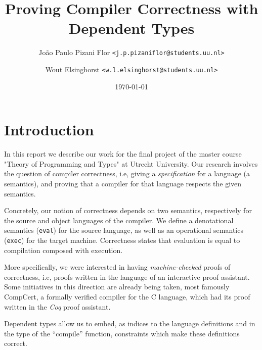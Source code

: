 \documentclass[a4paper]{article}
\title{Proving Compiler Correctness with Dependent Types}
\date{\today}
\author {
    João Paulo Pizani Flor \texttt{<j.p.pizaniflor@students.uu.nl>} \\
    \and Wout Elsinghorst \texttt{<w.l.elsinghorst@students.uu.nl>} \\
}
\begin{document}
    \maketitle

    \section{Introduction}
    \label{sec:intro}
        In this report we describe our work for the final project of the master course
        "Theory of Programming and Types" at Utrecht University. Our research involves
        the question of compiler correctness, i.e, giving a \emph{specification} for
        a language (a semantics), and proving that a compiler for that language respects
        the given semantics.

        Concretely, our notion of correctness depends on two semantics, respectively for the source
        and object languages of the compiler. We define a denotational semantics (\texttt{eval}) for the source
        language, as well as an operational semantics (\texttt{exec}) for the target machine. Correctness
        states that evaluation is equal to compilation composed with execution.

        More specifically, we were interested in having \emph{machine-checked} proofs of correctness,
        i.e, proofs written in the language of an interactive proof assistant. Some initiatives in
        this direction are already being taken, most famously CompCert, a formally verified compiler
        for the C language, which had its proof written in the \emph{Coq} proof assistant.

        

        Dependent types allow us to embed, as indices to the language definitions and in the type
        of the ``compile'' function, constraints which make these definitions correct.
\end{document}
